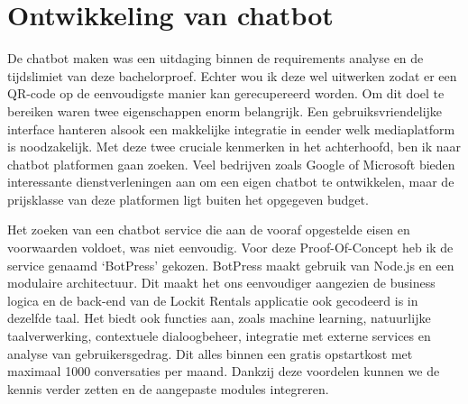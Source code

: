 \newpage

\section{Ontwikkeling van chatbot}%
\label{sec:OntwikkelingChatbot}
De chatbot maken was een uitdaging binnen de requirements analyse en de tijdslimiet van deze bachelorproef. Echter wou ik deze wel uitwerken zodat er een QR-code op de eenvoudigste manier kan gerecupereerd worden. Om dit doel te bereiken waren twee eigenschappen enorm belangrijk. Een gebruiksvriendelijke interface hanteren alsook een makkelijke integratie in eender welk mediaplatform is noodzakelijk. Met deze twee cruciale kenmerken in het achterhoofd, ben ik naar chatbot platformen gaan zoeken. Veel bedrijven zoals Google of Microsoft bieden interessante dienstverleningen aan om een eigen chatbot te ontwikkelen, maar de prijsklasse van deze platformen ligt buiten het opgegeven budget.

Het zoeken van een chatbot service die aan de vooraf opgestelde eisen en voorwaarden voldoet, was niet eenvoudig. Voor deze Proof-Of-Concept heb ik de service genaamd ‘BotPress’ gekozen. BotPress maakt gebruik van Node.js en een modulaire architectuur. Dit maakt het ons eenvoudiger aangezien de business logica en de back-end van de Lockit Rentals applicatie ook gecodeerd is in dezelfde taal. Het biedt ook functies aan, zoals machine learning, natuurlijke taalverwerking, contextuele dialoogbeheer, integratie met externe services en analyse van gebruikersgedrag. Dit alles binnen een gratis opstartkost met maximaal 1000 conversaties per maand. Dankzij deze voordelen kunnen we de kennis verder zetten en de aangepaste modules integreren.

